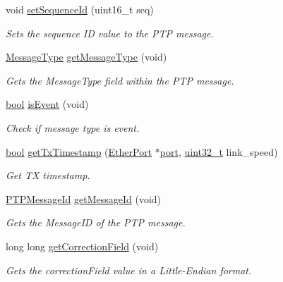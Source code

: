 \begin{DoxyCompactItemize}
void \hyperlink{class_p_t_p_message_common_a7fc215800bddc8a39e50e463ffbe651a}{set\+Sequence\+Id} (uint16\+\_\+t seq)
\begin{DoxyCompactList}\small\item\em Sets the sequence ID value to the P\+TP message. \end{DoxyCompactList}\item 
\hyperlink{avbts__message_8hpp_ac6606ebe91c8ac66a2c314c79f5ab013}{Message\+Type} \hyperlink{class_p_t_p_message_common_aa9e0a02eadc0da0ddbade7fdb09d9309}{get\+Message\+Type} (void)
\begin{DoxyCompactList}\small\item\em Gets the Message\+Type field within the P\+TP message. \end{DoxyCompactList}\item 
\hyperlink{avb__gptp_8h_af6a258d8f3ee5206d682d799316314b1}{bool} \hyperlink{class_p_t_p_message_common_a2dd36fdb6a9dbfcfdab03f6162581373}{is\+Event} (void)
\begin{DoxyCompactList}\small\item\em Check if message type is event. \end{DoxyCompactList}\item 
\hyperlink{avb__gptp_8h_af6a258d8f3ee5206d682d799316314b1}{bool} \hyperlink{class_p_t_p_message_common_a715dccee35cbc56372f8b003600b8ef9}{get\+Tx\+Timestamp} (\hyperlink{class_ether_port}{Ether\+Port} $\ast$\hyperlink{gst__avb__playbin_8c_a63c89c04d1feae07ca35558055155ffb}{port}, \hyperlink{parse_8c_a6eb1e68cc391dd753bc8ce896dbb8315}{uint32\+\_\+t} link\+\_\+speed)
\begin{DoxyCompactList}\small\item\em Get TX timestamp. \end{DoxyCompactList}\item 
\hyperlink{class_p_t_p_message_id}{P\+T\+P\+Message\+Id} \hyperlink{class_p_t_p_message_common_a5cd92d7e4383eedc84db3781940ba4e0}{get\+Message\+Id} (void)
\begin{DoxyCompactList}\small\item\em Gets the Message\+ID of the P\+TP message. \end{DoxyCompactList}\item 
long long \hyperlink{class_p_t_p_message_common_a9930feb44509700c6a81aa4e747357ca}{get\+Correction\+Field} (void)
\begin{DoxyCompactList}\small\item\em Gets the correction\+Field value in a Little-\/\+Endian format. \end{DoxyCompactList}\item 

\end{DoxyCompactItemize}
